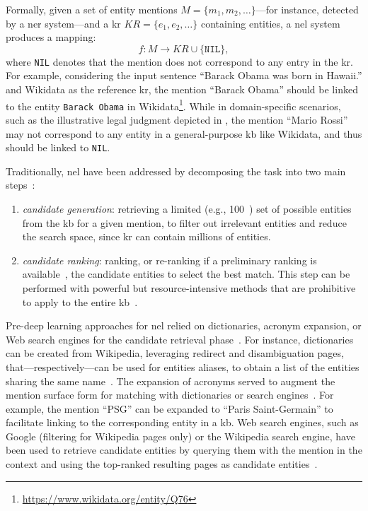 Formally, given a set of entity mentions $M = \{m_1, m_2, \ldots\}$---for instance, detected by a \ac{ner} system---and a \acl{kr} $KR = \{e_1, e_2, \ldots\}$ containing entities, a \ac{nel} system produces a mapping:
\begin{equation}
f: M \to KR \cup \{\texttt{NIL}\},
\end{equation}
where \texttt{NIL} denotes that the mention does not correspond to any entry in the \acl{kr}.  
For example, considering the input sentence ``Barack Obama was born in Hawaii.'' and Wikidata as the reference \ac{kr}, the mention ``Barack Obama'' should be linked to the entity \texttt{Barack Obama} in Wikidata\footnote{\url{https://www.wikidata.org/entity/Q76}}. While in domain-specific scenarios, such as the illustrative legal judgment depicted in , the mention ``Mario Rossi'' may not correspond to any entity in a general-purpose \ac{kb} like Wikidata, and thus should be linked to \texttt{NIL}.

Traditionally, \ac{nel} have been addressed by decomposing the task into two main steps~\cite{entity_linking_with_kb_2015}:
\begin{enumerate}
    \item \emph{candidate generation}: retrieving a limited (e.g., 100~\cite{blink}) set of possible entities from the \ac{kb} for a given mention, to filter out irrelevant entities and reduce the search space, since \ac{kr} can contain millions of entities.
    \item \emph{candidate ranking}: ranking, or re-ranking if a preliminary ranking is available~\cite{blink}, the candidate entities to select the best match. This step can be performed with powerful but resource-intensive methods that are prohibitive to apply to the entire \ac{kb}~\cite{blink}.
\end{enumerate}

Pre-deep learning approaches for \ac{nel} relied on dictionaries, acronym expansion, or Web search engines for the candidate retrieval phase~\cite{entity_linking_with_kb_2015}.
For instance, dictionaries can be created from Wikipedia, leveraging redirect and disambiguation pages, that---respectively---can be used for entities aliases, to obtain a list of the entities sharing the same name~\cite{entity_linking_with_kb_2015}.
The expansion of acronyms served to augment the mention surface form for matching with dictionaries or search engines~\cite{entity_linking_with_kb_2015}. For example, the mention ``PSG'' can be expanded to ``Paris Saint-Germain'' to facilitate linking to the corresponding entity in a \ac{kb}. Web search engines, such as Google (filtering for Wikipedia pages only) or the Wikipedia search engine, have been used to retrieve candidate entities by querying them with the mention in the context and using the top-ranked resulting pages as candidate entities~\cite{entity_linking_with_kb_2015}.

